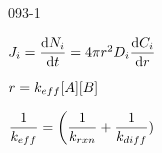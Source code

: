 \begin{mitframe}{093-1}
    \begin{listone}
    	\item $\molspecflux=\dfrac{\mathrm{d}\nummoles_{\state}}{\mathrm{d}\timet}=4\pi\pos^2\pdiff\dfrac{\mathrm{d}\conc_{\state}}{\mathrm{d}\pos}$
        \item $\pos=\thermcond_{eff}[\helmholtz][\exergy]$
        \item $\dfrac{1}{\thermcond_{eff}}=\bigg(\dfrac{1}{\thermcond_{rxn}}+\dfrac{1}{\thermcond_{diff}})$
    \end{listone}
\end{mitframe}